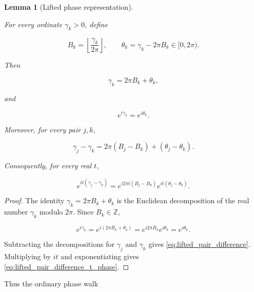 \documentclass[11pt]{amsart}
\numberwithin{equation}{section}
\theoremstyle{plain}
\newtheorem{lemma}[theorem]{Lemma}
\theoremstyle{definition}
\theoremstyle{remark}
\begin{document}
\begin{lemma}[Lifted phase representation]
\label{lem:lifted_phase_representation}

For every ordinate \(\gamma_k>0\), define

\begin{equation}
B_k=
\left\lfloor \frac{\gamma_k}{2\pi}\right\rfloor,
\qquad
\theta_k=\gamma_k-2\pi B_k\in[0,2\pi).
\label{eq:angular_lifting_ordinate}
\end{equation}

Then

\begin{equation}
\gamma_k=2\pi B_k+\theta_k,
\label{eq:lifting_recovers_ordinate}
\end{equation}

and

\begin{equation}
e^{i\gamma_k}=e^{i\theta_k}.
\label{eq:phase_depends_on_theta}
\end{equation}

Moreover, for every pair \(j,k\),

\begin{equation}
\gamma_j-\gamma_k
=
2\pi(B_j-B_k)+(\theta_j-\theta_k).
\label{eq:lifted_pair_difference}
\end{equation}

Consequently, for every real \(t\),

\begin{equation}
e^{it(\gamma_j-\gamma_k)}
=
e^{i2\pi t(B_j-B_k)}
e^{it(\theta_j-\theta_k)}.
\label{eq:lifted_pair_difference_t_phase}
\end{equation}

\end{lemma}

\begin{proof}
The identity \(\gamma_k=2\pi B_k+\theta_k\) is the Euclidean
decomposition of the real number \(\gamma_k\) modulo \(2\pi\). Since
\(B_k\in\mathbb Z\),

\begin{equation}
e^{i\gamma_k}
=
e^{i(2\pi B_k+\theta_k)}
=
e^{i2\pi B_k}e^{i\theta_k}
=
e^{i\theta_k}.
\end{equation}

Subtracting the decompositions for \(\gamma_j\) and \(\gamma_k\) gives
\eqref{eq:lifted_pair_difference}. Multiplying by \(it\) and
exponentiating gives \eqref{eq:lifted_pair_difference_t_phase}.
\end{proof}

Thus the ordinary phase walk
\end{document}
